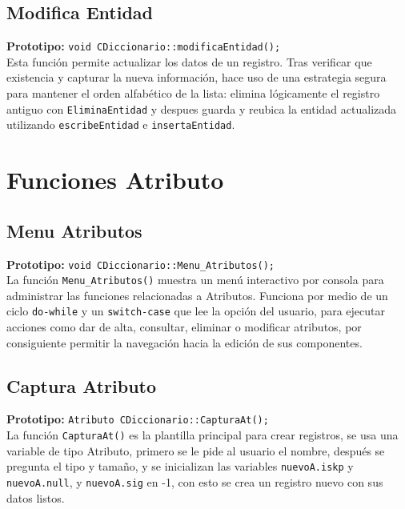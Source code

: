 \documentclass[12pt]{article}
\begin{document}
{}
\subsection*{Modifica Entidad}
\textbf{Prototipo:} \verb|void CDiccionario::modificaEntidad();|\\
Esta función permite actualizar los datos de un registro.
Tras verificar que existencia y capturar la nueva información,
hace uso de una estrategia segura para mantener el orden
alfabético de la lista: elimina lógicamente el registro
antiguo con \verb|EliminaEntidad| y despues guarda y
reubica la entidad actualizada utilizando
\verb|escribeEntidad| e \verb|insertaEntidad|.
\newpage

\section[Funciones Atributo]{Funciones \hfill \fontsize{14}{17}\selectfont Atributo}

{}
\subsection*{Menu Atributos}
\textbf{Prototipo:} \verb|void CDiccionario::Menu_Atributos();|\\
La función \verb|Menu_Atributos()| muestra un menú interactivo 
por consola para administrar las funciones relacionadas a 
Atributos. Funciona por medio de un ciclo \texttt{do-while} y 
un \texttt{switch-case} que lee la opción del usuario, 
para ejecutar acciones como dar de alta, consultar, 
eliminar o modificar atributos, por consiguiente permitir 
la navegación hacia la edición de sus componentes.

{}
\subsection*{Captura Atributo}
\textbf{Prototipo:} \verb|Atributo CDiccionario::CapturaAt();|\\
La función \verb|CapturaAt()| es la plantilla principal para 
crear registros, se usa una variable de tipo Atributo, primero 
se le pide al usuario el nombre, después se pregunta el tipo y 
tamaño, y se inicializan las variables \texttt{nuevoA.iskp} y 
\texttt{nuevoA.null}, y \texttt{nuevoA.sig} en -1, con esto se 
crea un registro nuevo con sus datos listos.
\end{document}
